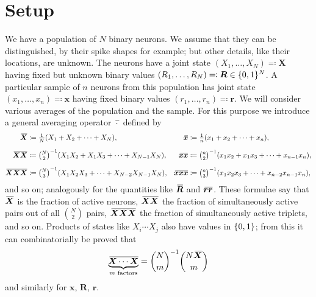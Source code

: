 \documentclass{article}
\theoremstyle{remark}
\theoremstyle{innote}
\newcommand*{\defd}{\coloneqq}
\newcommand*{\defs}{\eqqcolon}
\renewcommand*{\|}{\mathpunct{|}}%
\newcommand*{\dotv}{\mathord{\,\cdot\,}}%
\DeclarePairedDelimiter\set{\{}{\}}
\theoremstyle{simple}
\newtheorem*{simplenote}{}
\newcommand*{\puzzle}{{\fontencoding{U}\fontfamily{fontawesometwo}\selectfont\symbol{225}}}
\newcommand{\mynote}[1]{ {\color{notecolour}\puzzle\ #1}}
\newcommand*{\widebar}[1]{{\mkern1.5mu\skew{2}\overline{\mkern-1.5mu#1\mkern-1.5mu}\mkern 1.5mu}}
\newcommand*{\av}{\widebar} %
\newcommand*{\sav}{\widebar} %
\newcommand*{\yxx}{x}%
\newcommand*{\yx}{\bm{\yxx}}%
\newcommand*{\yX}{\bm{X}}%
\newcommand*{\yXf}{\av{\yX}}%
\newcommand*{\yXXf}{\av{\yX\yX}}%
\newcommand*{\yr}{\bm{r}}%
\newcommand*{\yR}{\bm{R}}%
\newcommand*{\yRf}{\av{\yR}}%
\begin{document}
\section{Setup}
\label{sec:setup}

We have a population of $N$ binary neurons. We assume that they can be
distinguished, by their spike shapes for example; but other details, like
their locations, are unknown. The neurons have a joint state
$(X_1,\dotsc,X_N) \defs \yX$ having fixed but unknown binary values
$(R_1,\dotsc,R_N)\defs \yR \in \set{0,1}^N$. A particular sample of $n$
neurons from this population has joint state $(x_1, \dotsc, x_n) \defs \yx$
having fixed binary values $(r_1, \dotsc, r_n)\defs\yr$. We will consider
various averages of the population and the sample. For this purpose we
introduce a general averaging operator $\sav{\dotv}$ defined by
\begin{align}
  \av{\yX}  &\defd \tfrac{1}{N} (X_1 + X_2 + \dotsb + X_N),
  &
  \sav{\yx}  &\defd \tfrac{1}{n} (x_1 + x_2 + \dotsb + x_n),
    \\[2\jot]
  \av{\yX \yX} &\defd
\tbinom{N}{2}^{-1} (X_1 X_2 + X_1 X_3  + \dotsb +  X_{N-1} X_N),
  &
    \sav{\yx \yx} &\defd
\tbinom{n}{2}^{-1} (x_1 x_2 + x_1 x_3  + \dotsb +  x_{n-1} x_n),
\\[2\jot]
\av{\yX\yX\yX} &\defd
                  \tbinom{N}{3}^{-1}
                  (X_1 X_2 X_3 +%
                   \dotsb + X_{N-2} X_{N-1}X_N),
  &
    \sav{\yx\yx\yx} &\defd
                      \tbinom{n}{3}^{-1} (x_1 x_2 x_3 + %
                       \dotsb + x_{n-2} x_{n-1} x_n),
\end{align}
and so on; analogously for the quantities like $\yRf$ and $\sav{\yr\yr}$.
These formulae say that $\yXf$ is the fraction of active neurons, $\yXXf$
the fraction of simultaneously active pairs out of all $\binom{N}{2}$
pairs, $\av{\yX\yX\yX}$ the fraction of simultaneously active triplets, and
so on. Products of states like $X_i \dotsm X_j$ also have values in
$\set{0,1}$; from this it can combinatorially be proved that
\begin{equation}
  \label{eq:products_intermsof_average}
  \av{\underbrace{\yX\dotsm\yX}_{\text{$m$ factors}}}
  = \binom{N}{m}^{-1}\binom{N\yXf}{m}
\end{equation}
and similarly for $\yx$, $\yR$, $\yr$.

\end{document}
